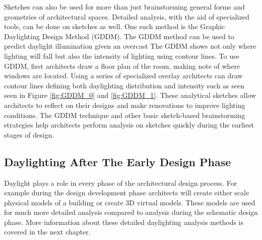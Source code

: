   Sketches can also be used for more than just brainstorming general forms and geometries of architectural spaces. 
  Detailed analysis, with the aid of specialized tools, can be done on sketches as well.
  One such method is the Graphic Daylighting Design Method (GDDM)\cite{millet1980graphic,moore}.
  The GDDM method can be used to predict daylight illumination given an overcast
  The GDDM shows not only where lighting will fall but also the intensity of lighting using contour lines.
  To use GDDM, first architects draw a floor plan of the room, making note of where windows are located.
  Using a series of specialized overlay architects can draw contour lines defining both daylighting distribution and intensity such as seen seen in Figure \ref{fig:GDDM_0} and \ref{fig:GDDM_1}.
  These analytical sketches allow architects to reflect on their designs and make renovations to improve lighting conditions.
  The GDDM technique and other basic sketch-based brainstorming strategies help architects perform analysis on sketches quickly during the earliest stages of design.




  \subsection{Daylighting After The Early Design Phase}
  Daylight plays a role in every phase of the architectural design process.
  For example during the design development phase architects will create either scale physical models of a building or create 3D virtual models.
  These models are used for much more detailed analysis compared to analysis during the schematic design phase.
  More information about these detailed daylighting analysis methods is covered in the next chapter.



